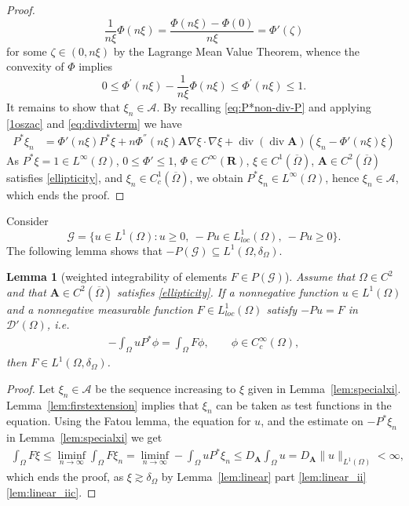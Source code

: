 \documentclass[12pt,a4paper]{amsart}
\newtheorem{lemma}[theorem]{\bf Lemma}
\theoremstyle{definition}
\newcommand{\A}{\mathbf{A}}
\newcommand*\Div{\operatorname{div}}
\begin{document}
\begin{proof}
\begin{equation*}
        \frac{1}{n\xi}\Phi(n\xi ) = \frac{\Phi(n\xi ) - \Phi(0)}{n\xi} = \Phi'(\zeta)
    \end{equation*}
    for some $\zeta \in (0, n\xi)$ by the Lagrange Mean Value Theorem, whence the convexity of $\Phi$ implies 
    \begin{equation*}
        0 \leq \Phi^{'}(n\xi ) - \frac{1}{n \xi}\Phi(n\xi ) \leq \Phi^{'}(n\xi ) \leq 1.
    \end{equation*}
    It remains to show that $\xi_n\in \mathcal{A}$. By recalling \eqref{eq:P*non-div-P} and applying \eqref{1oszac} and \eqref{eq:divdivterm} we have
    \begin{equation*}
    \begin{split}
         P^\ast \xi_n &= 
         \Phi'(n\xi) P^\ast \xi + n\Phi^{''}(n\xi ) \A \nabla\xi  \cdot \nabla\xi + \Div (\Div \A) (\xi_n - \Phi'(n\xi) \xi)
    \end{split}
    \end{equation*}
    As $P^\ast \xi = 1 \in L^{\infty}(\Omega)$, $0\leq \Phi' \leq 1$, $\Phi \in C^{\infty}(\mathbf{R})$, $\xi \in C^1(\overline{\Omega})$, $\A \in C^2(\overline{\Omega})$ satisfies \eqref{ellipticity}, and $\xi_n \in C^1_c(\overline{\Omega})$, we obtain $P^\ast \xi_n \in L^{\infty}(\Omega)$, hence $\xi_n \in \mathcal{A}$, which ends the proof.
\end{proof}

Consider $$\mathcal{G} = \{u\in L^1(\Omega): u\geq 0,\  -Pu\in L^1_{loc}(\Omega),\ -Pu\geq 0\}.$$
The following lemma shows that $-P(\mathcal{G})\subseteq L^1(\Omega,\delta_\Omega)$.

\begin{lemma}[weighted integrability of elements $F\in P(\mathcal{G})$]\label{lem:FL1loc}
   Assume that $\Omega \in C^{2}$ and that $\A\in C^{2}(\overline{\Omega})$ satisfies \eqref{ellipticity}. If a nonnegative function $u\in L^1(\Omega)$ and a nonnegative measurable function $F\in L^1_{loc}(\Omega)$ satisfy $-Pu = F$ in $\mathcal{D}'(\Omega)$, i.e.
    \begin{align*}  
        -\int_{\Omega} uP^\ast \phi = \int_{\Omega} F\phi,\qquad \phi\in C^\infty_c(\Omega),
    \end{align*}
    then $F\in L^1(\Omega,\delta_\Omega)$.
\end{lemma}

\begin{proof}
    Let $\xi_n \in \mathcal{A}$ be the sequence increasing to $\xi$ given in Lemma~\ref{lem:specialxi}. Lemma~\ref{lem:firstextension} implies that $\xi_n$ can be taken as test functions in the equation. Using the Fatou lemma, the equation for $u$, and the estimate on $-P^*\xi_n$ in Lemma~\ref{lem:specialxi} we get
    \begin{align*}
        \int_\Omega F\xi \leq \liminf\limits_{n\to \infty} \int_\Omega F\xi_n = \liminf\limits_{n\to \infty} -\int_\Omega u P^*\xi_n
        \leq D_{\A}\int_\Omega u 
        =D_{\A}\|u\|_{L^1(\Omega)} <\infty,
    \end{align*}
    which ends the proof, as $\xi \gtrsim \delta_\Omega$ by Lemma~\ref{lem:linear} part \ref{lem:linear_ii}\ref{lem:linear_iic}.
\end{proof}
\end{document}

